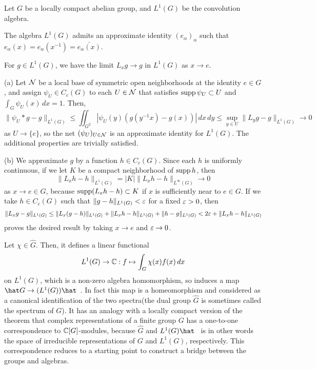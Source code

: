 \documentclass[a4paper]{article}
\begin{document}
\begin{lem}
Let $G$ be a locally compact abelian group, and $L^1(G)$ be the convolution algebra.
\begin{parts}
\item The algebra $L^1(G)$ admits an approximate identity $(e_\alpha)_\alpha$ such that $e_\alpha(x)=e_\alpha(x^{-1})=\bar{e_\alpha(x)}$.
\item For $g\in L^1(G)$, we have the limit $L_xg\to g$ in $L^1(G)$ as $x\to e$.
\end{parts}
\end{lem}
\begin{pf}
(a)
Let $\mathcal{N}$ be a local base of symmetric open neighborhoods at the identity $e\in G$, and assign $\psi_U\in C_c(G)$ to each $U\in\mathcal{N}$ that satisfies $\operatorname{supp}\psi_U\subset U$ and $\int_G\psi_U(x)\,dx=1$.
Then,
\[\|\psi_U*g-g\|_{L^1(G)}\le\iint_{G^2}|\psi_U(y)(g(y^{-1}x)-g(x))|\,dx\,dy\le\sup_{y\in U}\|L_yg-g\|_{L^1(G)}\to0\]
as $U\to\{e\}$, so the net $(\psi_U)_{U\in\mathcal{N}}$ is an approximate identity for $L^1(G)$.
The additional properties are trivially satisfied.

(b)
We approximate $g$ by a function $h\in C_c(G)$.
Since each $h$ is uniformly continuous, if we let $K$ be a compact neighborhood of $\operatorname{supp} h$, then
\[\|L_xh-h\|_{L^1(G)}=|K|\|L_xh-h\|_{L^\infty(G)}\to0\]
as $x\to e\in G$, because $\operatorname{supp}(L_xh-h)\subset K$ if $x$ is sufficiently near to $e\in G$.
If we take $h\in C_c(G)$ such that $\|g-h\|_{L^1(G)}<\varepsilon$ for a fixed $\varepsilon>0$, then
\[\|L_xg-g\|_{L^1(G)}\le\|L_x(g-h)\|_{L^1(G)}+\|L_xh-h\|_{L^1(G)}+\|h-g\|_{L^1(G)}<2\varepsilon+\|L_xh-h\|_{L^1(G)}\]
proves the desired result by taking $x\to e$ and $\varepsilon\to0$.
\end{pf}


Let $\chi\in\hat G$.
Then, it defines a linear functional
\[L^1(G)\to\mathbb{C}:f\mapsto\int_G\chi(x)f(x)\,dx\]
on $L^1(G)$, which is a non-zero algebra homomorphism, so induces a map $\hat G\to(L^1(G))\hat\enspace$.
In fact this map is a homeomorphism and considered as a canonical identification of the two spectra(the dual group $\hat G$ is sometimes called the spectrum of $G$).
It has an analogy with a locally compact version of the theorem that complex representations of a finite group $G$ has a one-to-one correspondence to $\mathbb{C}[G]$-modules, because $\hat G$ and $L^1(G)\hat\enspace$ is in other words the space of irreducible representations of $G$ and $L^1(G)$, respectively.
This correspondence reduces to a starting point to construct a bridge between the groups and algebras.
\end{document}
